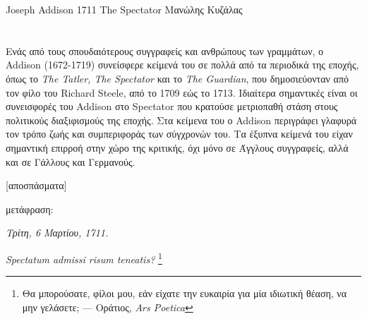 \translationsetup
    {Joseph Addison}
    {1711}
    {The Spectator}
    {Μανώλης Κυζάλας}

\pagestyle{texts}
\chapter[%
    \originalauthor\ -- \emph{\translatedtitle}\ \yearpublished\\%
    {\normalfont\emph{μετάφραση:} \maintranslator}%
]{\originalauthor}

\begin{preface}
    Ενάς από τους σπουδαιότερους συγγραφείς και ανθρώπους των γραμμάτων, ο Addison (1672-1719) συνείσφερε κείμενά του σε πολλά από τα περιοδικά της εποχής, όπως το \emph{The Tatler, The Spectator} και το \emph{The Guardian}, που δημοσιεύονταν από τον φίλο του Richard Steele, από το 1709 εώς το 1713. Ιδιαίτερα σημαντικές είναι οι συνεισφορές του Addison στο Spectator που κρατούσε μετριοπαθή στάση στους πολιτικούς διαξιφισμούς της εποχής. Στα κείμενα του ο Addison περιγράφει γλαφυρά τον τρόπο ζωής και συμπεριφοράς των σύγχρονών του. Τα έξυπνα κείμενά του είχαν σημαντική επιρροή στην χώρο της κριτικής, όχι μόνο σε Άγγλους συγγραφείς, αλλά και σε Γάλλους και Γερμανούς.
\end{preface}

\begin{center}
    \textbf{\translatedtitle}

    [αποσπάσματα]

    μετάφραση: \maintranslator
\end{center}

\begin{center}
    \emph{Τρίτη, 6 Μαρτίου, 1711.}

    \emph{Spectatum admissi risum teneatis?}%
    \footnote{Θα μπορούσατε, φίλοι μου, εάν είχατε την ευκαιρία για μία ιδιωτική θέαση, να μην γελάσετε; --- Οράτιος, \emph{Ars Poetica}}
\end{center}

